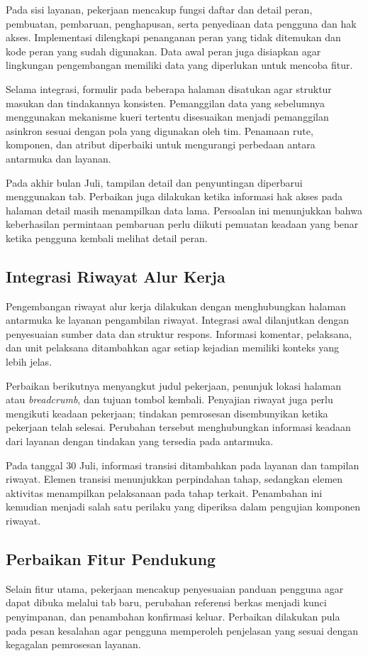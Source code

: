 Pada sisi layanan, pekerjaan mencakup fungsi daftar dan detail peran, pembuatan, pembaruan, penghapusan, serta penyediaan data pengguna dan hak akses. Implementasi dilengkapi penanganan peran yang tidak ditemukan dan kode peran yang sudah digunakan. Data awal peran juga disiapkan agar lingkungan pengembangan memiliki data yang diperlukan untuk mencoba fitur.

Selama integrasi, formulir pada beberapa halaman disatukan agar struktur masukan dan tindakannya konsisten. Pemanggilan data yang sebelumnya menggunakan mekanisme kueri tertentu disesuaikan menjadi pemanggilan asinkron sesuai dengan pola yang digunakan oleh tim. Penamaan rute, komponen, dan atribut diperbaiki untuk mengurangi perbedaan antara antarmuka dan layanan.

Pada akhir bulan Juli, tampilan detail dan penyuntingan diperbarui menggunakan tab. Perbaikan juga dilakukan ketika informasi hak akses pada halaman detail masih menampilkan data lama. Persoalan ini menunjukkan bahwa keberhasilan permintaan pembaruan perlu diikuti pemuatan keadaan yang benar ketika pengguna kembali melihat detail peran.

\subsection{Integrasi Riwayat Alur Kerja}
Pengembangan riwayat alur kerja dilakukan dengan menghubungkan halaman antarmuka ke layanan pengambilan riwayat. Integrasi awal dilanjutkan dengan penyesuaian sumber data dan struktur respons. Informasi komentar, pelaksana, dan unit pelaksana ditambahkan agar setiap kejadian memiliki konteks yang lebih jelas.

Perbaikan berikutnya menyangkut judul pekerjaan, penunjuk lokasi halaman atau \textit{breadcrumb}, dan tujuan tombol kembali. Penyajian riwayat juga perlu mengikuti keadaan pekerjaan; tindakan pemrosesan disembunyikan ketika pekerjaan telah selesai. Perubahan tersebut menghubungkan informasi keadaan dari layanan dengan tindakan yang tersedia pada antarmuka.

Pada tanggal 30 Juli, informasi transisi ditambahkan pada layanan dan tampilan riwayat. Elemen transisi menunjukkan perpindahan tahap, sedangkan elemen aktivitas menampilkan pelaksanaan pada tahap terkait. Penambahan ini kemudian menjadi salah satu perilaku yang diperiksa dalam pengujian komponen riwayat.

\subsection{Perbaikan Fitur Pendukung}
Selain fitur utama, pekerjaan mencakup penyesuaian panduan pengguna agar dapat dibuka melalui tab baru, perubahan referensi berkas menjadi kunci penyimpanan, dan penambahan konfirmasi keluar. Perbaikan dilakukan pula pada pesan kesalahan agar pengguna memperoleh penjelasan yang sesuai dengan kegagalan pemrosesan layanan.

